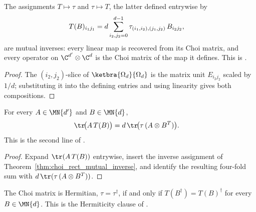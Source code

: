 \begin{theorem}
    \label{thm:choi_rect_mutual_inverse}
    \leanok
    The assignments $T\mapsto\tau$ and $\tau\mapsto T$, the latter defined
    entrywise by
    \begin{align}
        T(B)_{i_1 j_1}
          &= d\sum_{i_2,j_2=0}^{d-1}
            \tau_{(i_1,i_2),(j_1,j_2)}\,B_{i_2 j_2},
        \notag
    \end{align}
    are mutual inverses: every linear map is recovered from its Choi matrix,
    and every operator on $\C^{d'}\otimes\C^{d}$ is the Choi matrix of the
    map it defines. This is \cite[Proposition~2.1, Equation~(2.4)]{Wolf2012Quantum}.
\end{theorem}

\begin{proof}
    \leanok
    The $(i_2,j_2)$-slice of $\ketbra{\Omega_d}{\Omega_d}$ is the matrix
    unit $E_{i_2 j_2}$ scaled by $1/d$; substituting it into the defining
    entries and using linearity gives both compositions.
\end{proof}

\begin{theorem}
    \label{thm:choi_rect_trace_pairing}
    \leanok
    For every $A\in\MN{d'}$ and $B\in\MN{d}$,
    \begin{align}
        \tr\!\bigl(A\,T(B)\bigr)
          &= d\,\tr\!\bigl(\tau\,(A\otimes B^{T})\bigr).
        \notag
    \end{align}
    This is the second line of \cite[Proposition~2.1, Equation~(2.1)]{Wolf2012Quantum}.
\end{theorem}

\begin{proof}
    \leanok
    Expand $\tr(A\,T(B))$ entrywise, insert the inverse assignment of
    Theorem~\ref{thm:choi_rect_mutual_inverse}, and identify the resulting
    four-fold sum with $d\,\tr(\tau\,(A\otimes B^{T}))$.
\end{proof}

\begin{theorem}
    \label{thm:choi_rect_hermiticity}
    \leanok
    The Choi matrix is Hermitian, $\tau=\tau^\dagger$, if and only if
    $T(B^\dagger)=T(B)^\dagger$ for every $B\in\MN{d}$. This is the
    Hermiticity clause of \cite[Proposition~2.1]{Wolf2012Quantum}.
\end{theorem}

